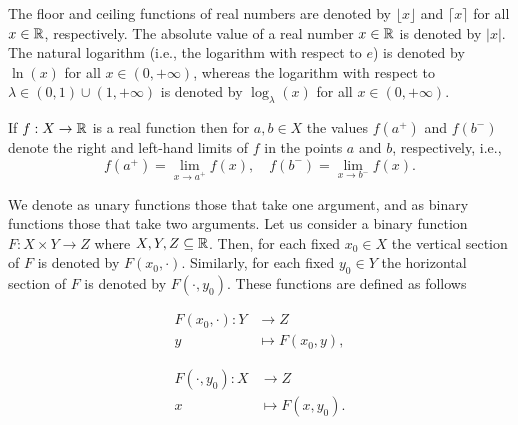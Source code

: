 The floor and ceiling functions of real numbers are denoted by $\lfloor x \rfloor$ and $\lceil x \rceil$ for all $x \in \mathbb{R}$, respectively. The absolute value of a real number $x \in \mathbb{R}$ is denoted by $|x|$. The natural logarithm (i.e., the logarithm with respect to $e$) is denoted by $\ln(x)$ for all $x \in (0,+\infty)$, whereas the logarithm with respect to $\lambda \in (0,1) \cup (1,+\infty)$ is denoted by $\log_{\lambda}(x)$ for all $x \in (0,+\infty)$.

If $f:X \to \mathbb{R}$ is a real function then for $a,b \in X$ the values $f(a^+)$ and $f(b^{-})$ denote the right and left-hand limits of $f$ in the points $a$ and $b$, respectively, i.e.,
$$f(a^+)= \lim_{x \to a^{+}} f(x), \quad f(b^{-})= \lim_{x \to b^{-}} f(x).$$

We denote as unary functions those that take one argument, and as binary functions those that take two arguments. Let us consider a binary function $F: X \times Y \to Z$ where $X,Y,Z \subseteq \mathbb{R}$. Then, for each fixed $x_0 \in X$ the vertical section of $F$ is denoted by $F(x_0,\cdot)$. Similarly, for each fixed $y_0 \in Y$ the horizontal section of $F$ is denoted by $F(\cdot,y_0)$. These functions are defined as follows
\begin{center}
\noindent\begin{minipage}{.35\linewidth}
\begin{align*}
	F(x_0,\cdot) \colon Y & \longrightarrow Z \\[-1ex]
	y & \longmapsto F(x_0,y),
\end{align*}
\end{minipage}%
\begin{minipage}{.35\linewidth}
\begin{align*}
	F(\cdot,y_0) \colon X & \longrightarrow Z \\[-1ex]
	x & \longmapsto F(x,y_0).
\end{align*}
\end{minipage}
\end{center}


